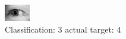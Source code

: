\begin{figure}[h!]
\begin{center}
\includegraphics[width=0.60\columnwidth]{figures/ID3137_class_3_target_4.png}
\end{center}
\caption{ Classification: 3 actual target: 4}
\label{fig:ID3137_class_3_target_4}
\end{figure}
